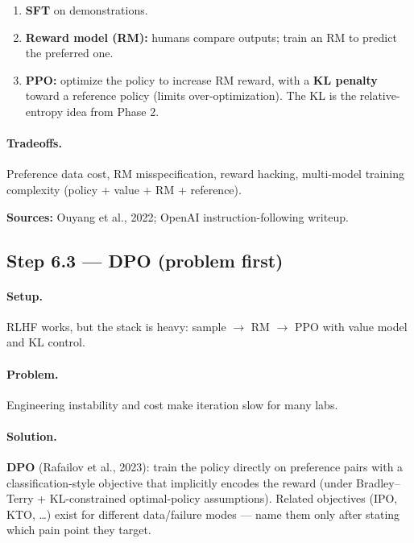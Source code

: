 \documentclass[11pt,a4paper]{article}
\begin{document}
\begin{enumerate}
\item \textbf{SFT} on demonstrations.  
\item \textbf{Reward model (RM):} humans compare outputs; train an RM to predict the preferred one.  
\item \textbf{PPO:} optimize the policy to increase RM reward, with a \textbf{KL penalty} toward a reference policy (limits over-optimization). The KL is the relative-entropy idea from Phase 2.
\end{enumerate}


\paragraph{Tradeoffs.}

Preference data cost, RM misspecification, reward hacking, multi-model training complexity (policy + value + RM + reference).


\textbf{Sources:} Ouyang et al., 2022; OpenAI instruction-following writeup.


\subsection{Step 6.3 --- DPO (problem first)}


\paragraph{Setup.}

RLHF works, but the stack is heavy: sample $\rightarrow$ RM $\rightarrow$ PPO with value model and KL control.


\paragraph{Problem.}

Engineering instability and cost make iteration slow for many labs.


\paragraph{Solution.}

\textbf{DPO} (Rafailov et al., 2023): train the policy directly on preference pairs with a classification-style objective that implicitly encodes the reward (under Bradley--Terry + KL-constrained optimal-policy assumptions). Related objectives (IPO, KTO, \ldots{}) exist for different data/failure modes --- name them only after stating which pain point they target.
\end{document}
